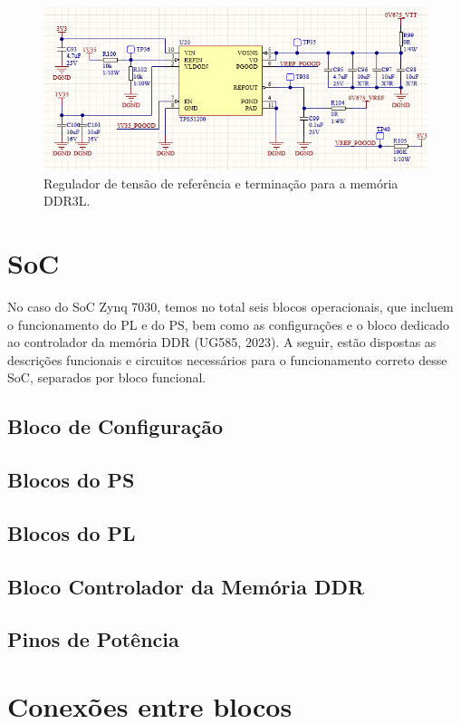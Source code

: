 \begin{figure}[H]
    \centering
    \includegraphics[scale=0.8]{images/refsupp.png}
    \caption{Regulador de tensão de referência e terminação para a memória DDR3L.}
    \label{fig:1v35ref}
\end{figure}

\section{SoC}

No caso do SoC Zynq 7030, temos no total seis blocos operacionais, que incluem o funcionamento do PL e do PS, bem como as configurações e o bloco dedicado ao controlador da memória DDR (UG585, 2023). A seguir, estão dispostas as descrições funcionais e circuitos necessários para o funcionamento correto desse SoC, separados por bloco funcional.

\subsection{Bloco de Configuração}

\subsection{Blocos do PS}

\subsection{Blocos do PL}

\subsection{Bloco Controlador da Memória DDR}

\subsection{Pinos de Potência}

\section{Conexões entre blocos}